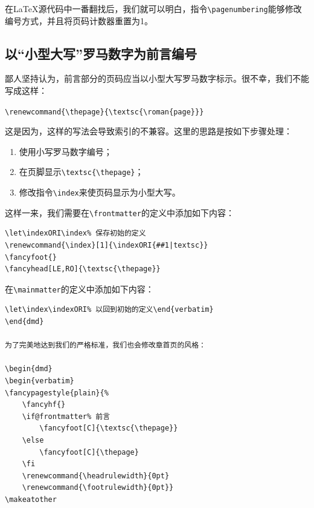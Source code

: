 在\LaTeX 源代码中一番翻找后，我们就可以明白，指令\verb|\pagenumbering|能够修改编号方式，并且将页码计数器重置为1。

%
%
\fancyhf{}
\fancyhead[LE]{\ongletpaire\bfseries\thepage}
\fancyhead[RO]{\bfseries\thepage\ongletimpaire}
\fancyhead[LO]{\bfseries\rightmark}
\fancyhead[RE]{\bfseries\leftmark}
\renewcommand{\footrulewidth}{0pt}

\subsection{以``小型大写''罗马数字为前言编号}

鄙人坚持认为，前言部分的页码应当以小型大写罗马数字标示。很不幸，我们不能写成这样：

\begin{dmd}
\verb|\renewcommand{\thepage}{\textsc{\roman{page}}}|
\end{dmd}

这是因为，这样的写法会导致索引的不兼容。这里的思路是按如下步骤处理：

\begin{enumerate}
    \item 使用小写罗马数字编号；
    \item 在页脚显示\verb|\textsc{\thepage}|；
    \item 修改指令\verb|\index|来使页码显示为小型大写。
\end{enumerate}

这样一来，我们需要在\verb|\frontmatter|的定义中添加如下内容：

\begin{dmd}
\begin{verbatim}
\let\indexORI\index% 保存初始的定义
\renewcommand{\index}[1]{\indexORI{##1|textsc}} 
\fancyfoot{}
\fancyhead[LE,RO]{\textsc{\thepage}}\end{verbatim}
\end{dmd}

在\verb|\mainmatter|的定义中添加如下内容：

\begin{dmd}
\begin{verbatim}
\let\index\indexORI% 以回到初始的定义\end{verbatim}
\end{dmd}

为了完美地达到我们的严格标准，我们也会修改章首页的风格：

\begin{dmd}
\begin{verbatim}
\fancypagestyle{plain}{% 
    \fancyhf{}
    \if@frontmatter% 前言
        \fancyfoot[C]{\textsc{\thepage}}
    \else
        \fancyfoot[C]{\thepage}
    \fi
    \renewcommand{\headrulewidth}{0pt}
    \renewcommand{\footrulewidth}{0pt}}
\makeatother\end{verbatim}
\end{dmd}

